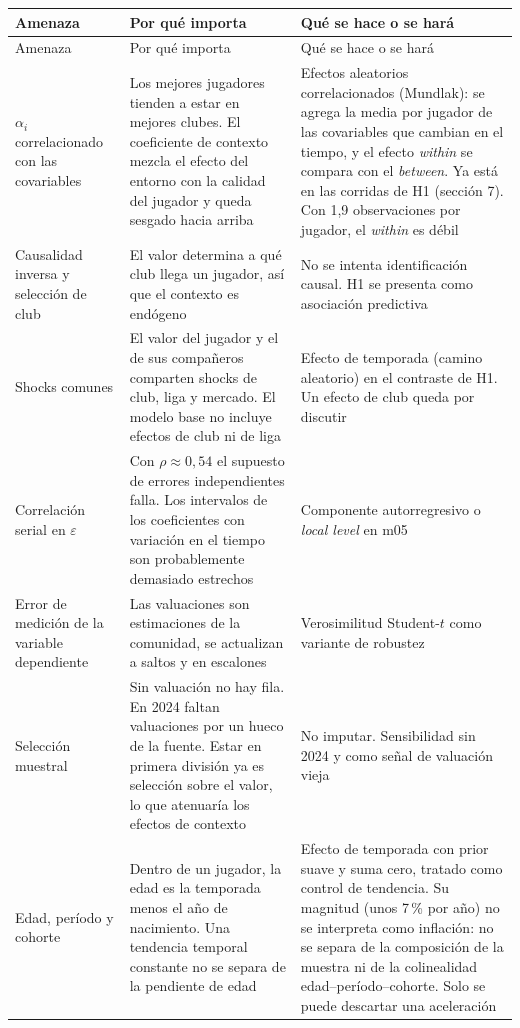 \documentclass[11pt,a4paper]{article}
\newcommand{\var}[1]{\texttt{\detokenize{#1}}}
\begin{document}
{\small
\begin{longtable}{@{}>{\raggedright\arraybackslash}p{3.3cm}>{\raggedright\arraybackslash}p{6.0cm}>{\raggedright\arraybackslash}p{5.2cm}@{}}
\toprule
Amenaza & Por qué importa & Qué se hace o se hará \\
\midrule
\endfirsthead
\toprule
Amenaza & Por qué importa & Qué se hace o se hará \\
\midrule
\endhead
\bottomrule
\endfoot
$\alpha_i$ correlacionado con las covariables & Los mejores jugadores tienden a estar en mejores clubes. El coeficiente de contexto mezcla el efecto del entorno con la calidad del jugador y queda sesgado hacia arriba & Efectos aleatorios correlacionados (Mundlak): se agrega la media por jugador de las covariables que cambian en el tiempo, y el efecto \emph{within} se compara con el \emph{between}. Ya está en las corridas de H1 (sección 7). Con 1,9 observaciones por jugador, el \emph{within} es débil \\
\addlinespace
Causalidad inversa y selección de club & El valor determina a qué club llega un jugador, así que el contexto es endógeno & No se intenta identificación causal. H1 se presenta como asociación predictiva \\
\addlinespace
Shocks comunes & El valor del jugador y el de sus compañeros comparten shocks de club, liga y mercado. El modelo base no incluye efectos de club ni de liga & Efecto de temporada (camino aleatorio) en el contraste de H1. Un efecto de club queda por discutir \\
\addlinespace
Correlación serial en $\varepsilon$ & Con $\rho \approx 0{,}54$ el supuesto de errores independientes falla. Los intervalos de los coeficientes con variación en el tiempo son probablemente demasiado estrechos & Componente autorregresivo o \emph{local level} en m05 \\
\addlinespace
Error de medición de la variable dependiente & Las valuaciones son estimaciones de la comunidad, se actualizan a saltos y en escalones & Verosimilitud Student-$t$ como variante de robustez \\
\addlinespace
Selección muestral & Sin valuación no hay fila. En 2024 faltan valuaciones por un hueco de la fuente. Estar en primera división ya es selección sobre el valor, lo que atenuaría los efectos de contexto & No imputar. Sensibilidad sin 2024 y \var{rezago_previo} como señal de valuación vieja \\
\addlinespace
Edad, período y cohorte & Dentro de un jugador, la edad es la temporada menos el año de nacimiento. Una tendencia temporal constante no se separa de la pendiente de edad & Efecto de temporada con prior suave y suma cero, tratado como control de tendencia. Su magnitud (unos 7\,\% por año) no se interpreta como inflación: no se separa de la composición de la muestra ni de la colinealidad edad--período--cohorte. Solo se puede descartar una aceleración \\

\end{longtable}}
\end{document}
